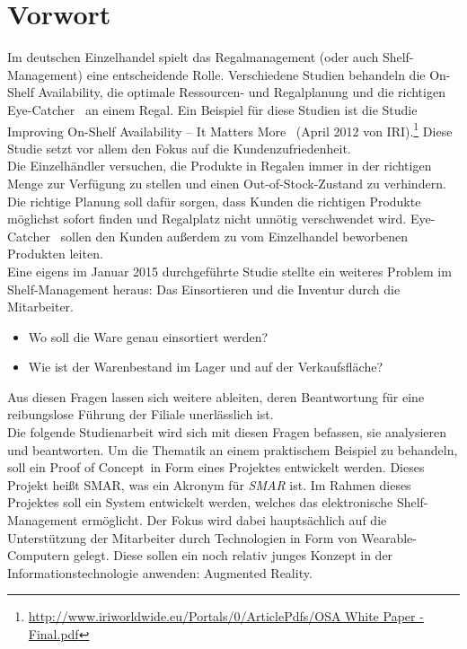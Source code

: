 \chapter{Vorwort}
\label{cha:vorwort}
Im deutschen Einzelhandel spielt das Regalmanagement (oder auch Shelf-Management) eine entscheidende Rolle. Verschiedene Studien behandeln die \glqq On-Shelf Availability\grqq , die optimale Ressourcen- und Regalplanung und die richtigen \glqq Eye-Catcher\grqq~ an einem Regal. Ein Beispiel für diese Studien ist \zB die Studie \glqq Improving On-Shelf Availability -- It Matters More\grqq~ (April 2012 von IRI).\footnote{\url{http://www.iriworldwide.eu/Portals/0/ArticlePdfs/OSA White Paper - Final.pdf}} Diese Studie setzt vor allem den Fokus auf die Kundenzufriedenheit.\\

Die Einzelhändler versuchen, die Produkte in Regalen immer in der richtigen Menge zur Verfügung zu stellen und einen \glqq Out-of-Stock\grqq -Zustand zu verhindern. Die richtige Planung soll dafür sorgen, dass Kunden die richtigen Produkte möglichst sofort finden und Regalplatz nicht unnötig verschwendet wird. \glqq Eye-Catcher\grqq~ sollen den Kunden außerdem zu vom Einzelhandel beworbenen Produkten leiten.\\

Eine eigens im Januar 2015 durchgeführte Studie stellte ein weiteres Problem im Shelf-Management heraus: Das Einsortieren und die Inventur durch die Mitarbeiter.
\begin{itemize}
	\item Wo soll die Ware genau einsortiert werden?
	\item Wie ist der Warenbestand im Lager und auf der Verkaufsfläche?
\end{itemize}
Aus diesen Fragen lassen sich weitere ableiten, deren Beantwortung für eine reibungslose Führung der Filiale unerlässlich ist.\\

Die folgende Studienarbeit wird sich mit diesen Fragen befassen, sie analysieren und beantworten. Um die Thematik an einem praktischem Beispiel zu behandeln, soll ein \glqq Proof of Concept\grqq~in Form eines Projektes entwickelt werden. Dieses Projekt heißt \acs{SMAR}, was ein Akronym für \emph{\acl{SMAR}} ist. Im Rahmen dieses Projektes soll ein System entwickelt werden, welches das elektronische Shelf-Management ermöglicht. Der Fokus wird dabei hauptsächlich auf die Unterstützung der Mitarbeiter durch Technologien in Form von Wearable-Computern gelegt. Diese sollen ein noch relativ junges Konzept in der Informationstechnologie anwenden: Augmented Reality.

